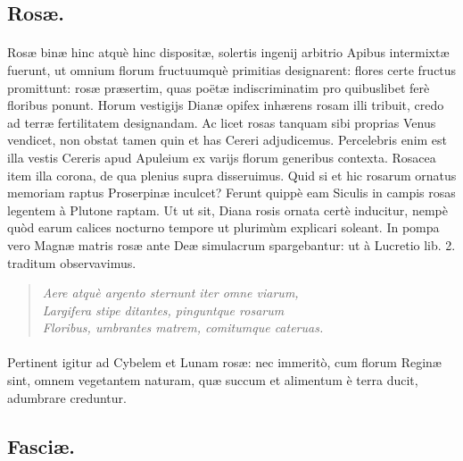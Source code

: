 \documentclass[a4paper, 11pt, oneside, polutonikogreek, latin]{article}
\begin{document}
\subsection{Rosæ.}
\paragraph{}
Rosæ binæ hinc atquè hinc dispositæ, solertis ingenij arbitrio Apibus intermixtæ fuerunt, ut omnium florum fructuumquè primitias designarent: flores certe fructus promittunt: rosæ præsertim, quas poëtæ indiscriminatim pro quibuslibet ferè floribus ponunt. Horum vestigijs Dianæ opifex inhærens rosam illi tribuit, credo ad terræ fertilitatem designandam. Ac licet rosas tanquam sibi proprias Venus vendicet, non obstat tamen quin et has Cereri adjudicemus. Percelebris enim est illa vestis Cereris apud Apuleium ex varijs florum generibus contexta. Rosacea item illa corona, de qua plenius supra disseruimus. Quid si et hic rosarum ornatus memoriam raptus Proserpinæ inculcet? Ferunt quippè eam Siculis in campis rosas legentem à Plutone raptam. Ut ut sit, Diana rosis ornata certè inducitur, nempè quòd earum calices nocturno tempore ut plurimùm explicari soleant. In pompa vero Magnæ matris rosæ ante Deæ simulacrum spargebantur: ut à Lucretio lib. 2. traditum observavimus.
\begin{quote}
\emph{Aere atquè argento sternunt iter omne viarum,}\\
\emph{Largifera stipe ditantes, pinguntque rosarum}\\
\emph{Floribus, umbrantes matrem, comitumque cateruas.}\\
\end{quote}
\paragraph{}
Pertinent igitur ad Cybelem et Lunam rosæ: nec immeritò, cum florum Reginæ sint, omnem vegetantem naturam, quæ succum et alimentum è terra ducit, adumbrare creduntur.
\clearpage
\subsection{Fasciæ.}
\end{document}
